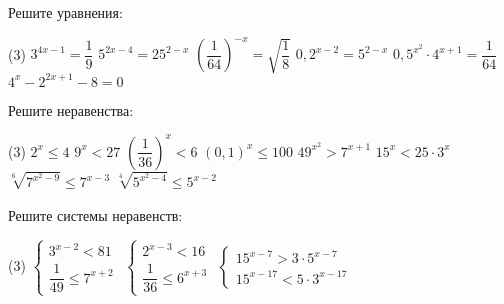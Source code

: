 \begin{class}[number=5]
	\begin{listofex}
		\item Решите уравнения:
		\begin{tasks}(3)
			\task \( 3^{4x-1}=\dfrac{1}{9} \)
			\task \( 5^{2x-4}=25^{2-x} \)
			\task \( \left(\dfrac{1}{64}\right)^{-x}=\sqrt{\dfrac{1}{8}} \)
			\task \( 0,2^{x-2}=5^{2-x} \)
			\task \( 0,5^{x^2}\cdot 4^{x+1}=\dfrac{1}{64} \)
			\task \( 4^x-2^{2x+1}-8=0 \)
		\end{tasks}
		\item Решите неравенства: %
		\begin{tasks}(3)
			\task \( 2^x \le 4 \)
			\task \( 9^x < 27 \)
			\task \( \left( \dfrac{1}{36} \right)^x < 6  \)
			\task \( (0,1)^x \le 100 \)
			\task \( 49^{x^2}>7^{x+1} \)
			\task \( 15^x<25\cdot 3^x \)
			\task \( \sqrt[6]{7^{x^2-9}} \le 7^{x-3} \)
			\task \( \sqrt[4]{5^{x^2-4}} \le 5^{x-2} \)
		\end{tasks}
		\item Решите системы неравенств:
		\begin{tasks}(3)
			\task \( \begin{cases} 3^{x-2}<81 \\ \dfrac{1}{49} \le 7^{x+2} \end{cases} \)
			\task \( \begin{cases} 2^{x-3}<16 \\ \dfrac{1}{36} \le 6^{x+3} \end{cases} \)
			\task \( \begin{cases} 15^{x-7}>3 \cdot 5^{x-7} \\ 15^{x-17}<5 \cdot 3^{x-17} \end{cases} \)
		\end{tasks}
	\end{listofex}
	\end{class}
	
